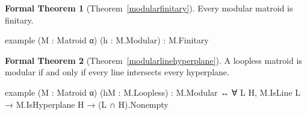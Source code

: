 \documentclass{amsart}
\theoremstyle{plain}
\theoremstyle{definition}
\newtheorem*{fthm}{Formal Theorem}
\begin{document}
\begin{fthm}[Theorem~\ref{modularfinitary}]
  Every modular matroid is finitary. 
  \begin{leancode}
example (M : Matroid α) (h : M.Modular) : M.Finitary
  \end{leancode}
\end{fthm}

\begin{fthm}[Theorem~\ref{modularlinehyperplane}]
  A loopless matroid is modular if and only if every line intersects every hyperplane.
  \begin{leancode}
example (M : Matroid α) (hM : M.Loopless) :
  M.Modular ↔ ∀ L H, M.IsLine L → M.IsHyperplane H → (L ∩ H).Nonempty
  \end{leancode}
\end{fthm}
\end{document}

